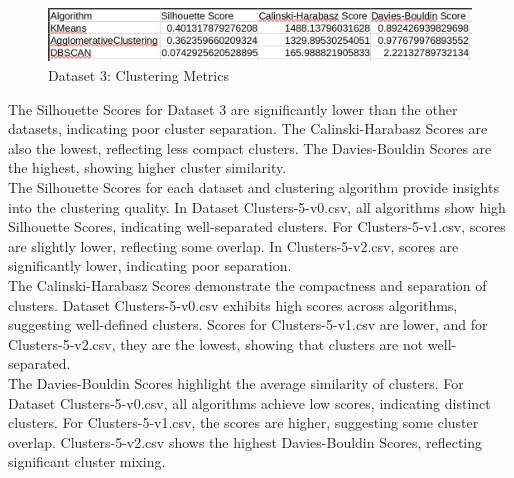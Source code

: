 \begin{figure}[H]
	\centering
	\includegraphics[width=0.9\linewidth]{Metrics/dataset-3.png}
	\caption{Dataset 3: Clustering Metrics}
	\label{fig:dataset-3}
\end{figure}

The Silhouette Scores for Dataset 3 are significantly lower than the other datasets, indicating poor cluster separation. The Calinski-Harabasz Scores are also the lowest, reflecting less compact clusters. The Davies-Bouldin Scores are the highest, showing higher cluster similarity. \\

The Silhouette Scores for each dataset and clustering algorithm provide insights into the clustering quality. In Dataset Clusters-5-v0.csv, all algorithms show high Silhouette Scores, indicating well-separated clusters. For Clusters-5-v1.csv, scores are slightly lower, reflecting some overlap. In Clusters-5-v2.csv, scores are significantly lower, indicating poor separation. \\

The Calinski-Harabasz Scores demonstrate the compactness and separation of clusters. Dataset Clusters-5-v0.csv exhibits high scores across algorithms, suggesting well-defined clusters. Scores for Clusters-5-v1.csv are lower, and for Clusters-5-v2.csv, they are the lowest, showing that clusters are not well-separated. \\

The Davies-Bouldin Scores highlight the average similarity of clusters. For Dataset Clusters-5-v0.csv, all algorithms achieve low scores, indicating distinct clusters. For Clusters-5-v1.csv, the scores are higher, suggesting some cluster overlap. Clusters-5-v2.csv shows the highest Davies-Bouldin Scores, reflecting significant cluster mixing. \\


\clearpage